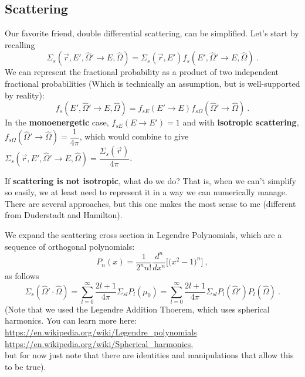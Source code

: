 \documentclass[12pt]{article}
\newcommand{\vOmega}{\ensuremath{\hat{\Omega}}}
\begin{document}
\subsection*{Scattering}
Our favorite friend, double differential scattering, can be simplified. Let's start by recalling
\[\Sigma_s(\vec{r}, E', \vOmega' \rightarrow E, \vOmega) = \Sigma_s(\vec{r},E') f_s(E', \vOmega' \rightarrow E, \vOmega)\:.\]
We can represent the fractional probability as a product of two independent fractional probabilities (Which is technically an assumption, but is well-supported by reality):
\[f_s(E', \vOmega' \rightarrow E, \vOmega) = f_{sE}(E' \rightarrow E) f_{s\Omega}(\vOmega'  \rightarrow \vOmega)\:.\]
%
In the \textbf{monoenergetic} case, $f_{sE}(E \rightarrow E') = 1$ and with \textbf{isotropic scattering}, $f_{s\Omega}(\vOmega'  \rightarrow \vOmega) = \dfrac{1}{4\pi}$, which would combine to give $\Sigma_s(\vec{r}, E', \vOmega' \rightarrow E, \vOmega) = \dfrac{\Sigma_s(\vec{r})}{4 \pi}$.

If \textbf{scattering is not isotropic}, what do we do? That is,  when we can't simplify so easily, we at least need to represent it in a way we can numerically manage. There are several approaches, but this one makes the most sense to me (different from Duderstadt and Hamilton). 

We expand the scattering cross section in Legendre Polynomials, which are a sequence of orthogonal polynomials:
%
\[P_n(x) = \frac{1}{2^n n!}\frac{d^n}{dx^n} \bigl[\bigl( x^2 -1 \bigr)^n\bigr]\:,\]
as follows
\[\Sigma_s(\vOmega' \cdot \vOmega) = \sum_{l=0}^{\infty} \frac{2l+1}{4\pi} \Sigma_{sl} P_l(\mu_0) = \sum_{l=0}^{\infty} \frac{2l+1}{4\pi} \Sigma_{sl} P_l(\vOmega')P_l(\vOmega) \:. \]
%
(Note that we used the Legendre Addition Thoerem, which uses spherical harmonics. You can learn more here:\\
\hspace*{2em}\href{https://en.wikipedia.org/wiki/Legendre_polynomials}{https://en.wikipedia.org/wiki/Legendre\_polynomials}\\ \hspace*{2em}\href{https://en.wikipedia.org/wiki/Spherical_harmonics}{https://en.wikipedia.org/wiki/Spherical\_harmonics},\\
but for now just note that there are identities and manipulations that allow this to be true). 
\end{document}
